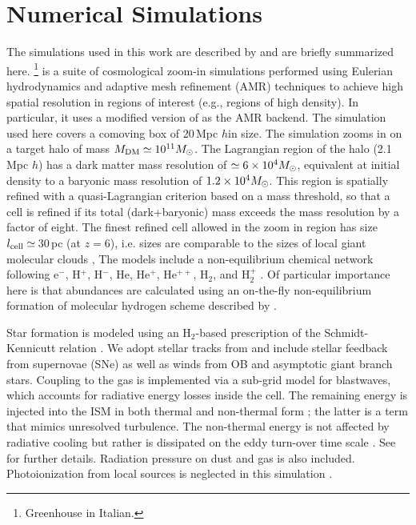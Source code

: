 \IfFileExists{emulateapjlegacy.cls}{\documentclass[iop]{emulateapjlegacy}}{\documentclass[iop]{emulateapj}}
\begin{document}
\section{Numerical Simulations}\label{sec:sim}
The simulations used in this work are described by \citet{Pallottini17a, Pallottini17b} and are briefly summarized here.
%
\footnote{Greenhouse in Italian.} is a suite of cosmological zoom-in simulations performed using Eulerian hydrodynamics and adaptive mesh refinement (AMR) techniques to achieve high spatial resolution in regions of interest (e.g., regions of high density).
%
In particular, it uses a modified version of  \citep{Teyssier02a} as the AMR backend. The simulation used here covers a comoving box of 20\,Mpc $h$\pmOne in size. The simulation zooms in on a target halo of mass $M_{\rm DM}\simeq10^{11} \mbox{$M_{\odot}$}$. The Lagrangian region of the halo (2.1\,Mpc $h$\pmOne) has a dark matter mass resolution of $\simeq 6\times 10^4 \mbox{$M_{\odot}$}$, equivalent at initial density to a baryonic mass resolution of $1.2 \times 10^4 \mbox{$M_{\odot}$}$. This region is spatially refined with a quasi-Lagrangian criterion based on a mass threshold, so that a cell is refined if its total (dark+baryonic) mass exceeds the mass resolution by a factor of eight. The finest refined cell allowed in the zoom in region has size $l_{\rm cell}\simeq$\,30\,pc (at $z = 6$), i.e. sizes are comparable to the sizes of local giant molecular clouds \citep[e.g.,][]{Sanders85a, Federrath13a, Goodman14a},
%
The models include a non-equilibrium chemical network following e$^{-}$, H$^+$, H$^-$, He, He$^+$, He$^{++}$, H$_2$, and H$_2^+$ \citep{Grassi14a,Bovino16a}. Of particular importance here is that abundances are calculated using an on-the-fly non-equilibrium formation of molecular hydrogen scheme described by \citet{Pallottini17a}.

Star formation is modeled using an H$_2$-based prescription of the Schmidt-Kennicutt relation \citep{Krumholz09a}. We adopt stellar
tracks from  and include stellar feedback from supernovae (SNe) as well as winds from OB and asymptotic giant branch stars. Coupling to the gas is implemented via a sub-grid model for blastwaves, which accounts for radiative energy losses inside the cell.
%
The remaining energy is injected into the ISM in both thermal and non-thermal form \citep{Agertz13a}; the latter is a term that mimics unresolved turbulence. The non-thermal energy is not affected by radiative cooling but rather is dissipated on the eddy turn-over time scale \citep{Maclow99a}. See \citet{Pallottini17b} for further details.
%
Radiation pressure on dust and gas is also included. Photoionization from local sources is neglected in this simulation \citep[see][for its effect]{Pallottini19a, Decataldo19a}.
\end{document}
